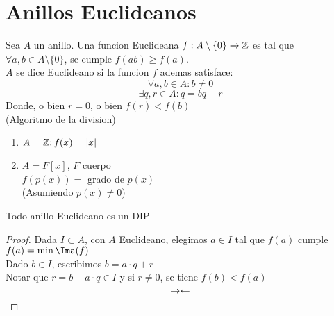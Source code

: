     \chapter{Anillos Euclideanos}
    Sea $A$ un anillo. Una funcion Euclideana $f:A\setminus\{0\}\xrightarrow[]{}\mathbb{Z}$ es tal que $\forall a,b\in A\setminus\{0\}$, se cumple $f(ab)\geq f(a)$.\\
    $A$ se dice Euclideano si la funcion $f$ ademas satisface:
    \[\forall a,b \in A:b\neq 0\]
    \[\exists q,r\in A:q=bq+r\]
    Donde, o bien $r=0$, o bien $f(r)<f(b)$\\
    (Algoritmo de la division)
    \begin{ejm}
        \hfill
        \begin{enumerate}
            \item $A=\mathbb{Z}; f(x)=|x|$

            \item $A=F[x]$, $F$ cuerpo\\
            $f(p(x))=$ grado de $p(x)$\\
            (Asumiendo $p(x)\neq 0$)
        \end{enumerate}
    \end{ejm}

    \begin{obs}
        Todo anillo Euclideano es un DIP
        \begin{proof}
            Dada $I\subset A$, con $A$ Euclideano, elegimos $a\in I$ tal que $f(a)$ cumple $f(a)=\min\Ima(f)$\\
            Dado $b\in I$, escribimos $b=a\cdot q+r$\\
            Notar que $r=b-a\cdot q\in I$ y si $r\neq 0$, se tiene $f(b)<f(a)$
            \[\rightarrow\leftarrow\]
        \end{proof}
    \end{obs}

